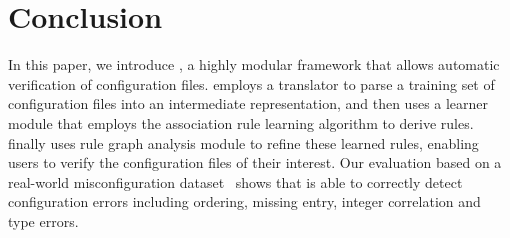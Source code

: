 
\section{Conclusion}

In this paper, we introduce \app, a highly modular framework 
that allows automatic verification of configuration files.
\app employs a translator to parse a training set
of configuration files into an intermediate representation,
and then uses a learner module that employs
the association rule learning algorithm to derive rules.
\app finally uses rule graph analysis module to refine these learned
rules, enabling users to verify the configuration files of
their interest.
Our evaluation based on a real-world misconfiguration
dataset~\cite{configdataset} shows that \app is able to
correctly detect configuration errors
including ordering, missing entry, integer correlation
and type errors.


